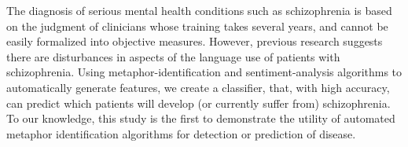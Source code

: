 The diagnosis of serious mental health conditions such as schizophrenia is based on the judgment of clinicians whose training takes several years, and cannot be easily formalized into objective measures. However, previous research suggests there are disturbances in aspects of the language use of patients with schizophrenia. Using metaphor-identification and sentiment-analysis algorithms to automatically generate features, we create a classifier, that, with high accuracy, can predict which patients will develop (or currently suffer from) schizophrenia. To our knowledge, this study is the first to demonstrate the utility of automated metaphor identification algorithms for detection or prediction of disease.
